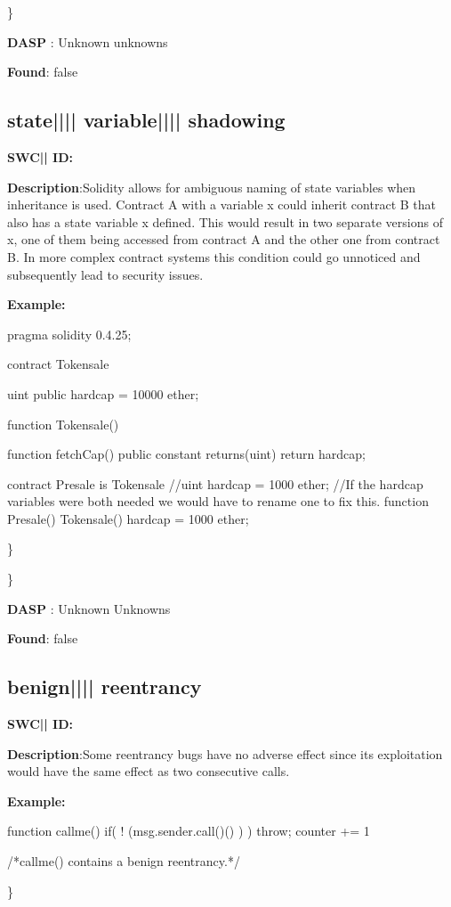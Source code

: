 \documentclass{article}
\begin{document}
\} 

\textbf{DASP} : Unknown unknowns

\textbf{Found}: false

\subsection{state{||\textunderscore|| }variable{||\textunderscore|| }shadowing} 
\textbf{SWC{|\textunderscore| }ID:} 

\textbf{Description}:Solidity allows for ambiguous naming of state variables when inheritance is used. Contract A with a variable x could inherit contract B that also has a state variable x defined. This would result in two separate versions of x, one of them being accessed from contract A and the other one from contract B. In more complex contract systems this condition could go unnoticed and subsequently lead to security issues.


\textbf{Example:} 
\begin{ffcode} 

pragma solidity 0.4.25;

contract Tokensale {
    uint public hardcap = 10000 ether;

    function Tokensale() {}

    function fetchCap() public constant returns(uint) {
        return hardcap;
    }
}

contract Presale is Tokensale {
    //uint hardcap = 1000 ether;
    //If the hardcap variables were both needed we would have to rename one to fix this.
    function Presale() Tokensale() {
        hardcap = 1000 ether;
    }
}

\end{ffcode} 
\} 

\} 

\textbf{DASP} : Unknown Unknowns

\textbf{Found}: false

\subsection{benign{||\textunderscore|| }reentrancy} 
\textbf{SWC{|\textunderscore| }ID:} 

\textbf{Description}:Some re{\textendash}entrancy bugs have no adverse effect since its exploitation would have the same effect as two consecutive calls.


\textbf{Example:} 
\begin{ffcode} 

function callme(){
  if( ! (msg.sender.call()() ) ){
    throw;
  }
  counter += 1
}

 /*callme() contains a benign reentrancy.*/ 

\end{ffcode} 
\} 
\end{document}
